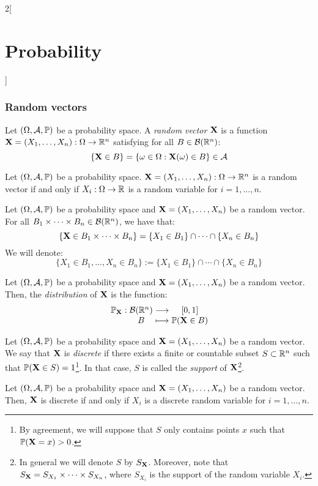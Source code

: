 \documentclass[../../../main.tex]{subfiles}
\begin{document}
\begin{multicols}{2}[\section{Probability}]
  \subsubsection{Random vectors}
  \begin{definition}
    Let $(\Omega,\mathcal{A},\mathbb{P})$ be a probability space. A \emph{random vector} $\boldsymbol{\mathrm{X}}$ is a function $\boldsymbol{\mathrm{X}}=(X_1,\ldots,X_n):\Omega\rightarrow\mathbb{R}^n$ satisfying for all $B\in\mathcal{B}(\mathbb{R}^n)$: $$\{\boldsymbol{\mathrm{X}}\in B\}=\{\omega\in\Omega:\boldsymbol{\mathrm{X}}(\omega)\in B\}\in\mathcal{A}$$
  \end{definition}
  \begin{proposition}
    Let $(\Omega,\mathcal{A},\mathbb{P})$ be a probability space. $\boldsymbol{\mathrm{X}}=(X_1,\ldots,X_n):\Omega\rightarrow\mathbb{R}^n$ is a random vector if and only if $X_i:\Omega\rightarrow\mathbb{R}$ is a random variable for $i=1,\ldots,n$.
  \end{proposition}
  \begin{definition}
    Let $(\Omega,\mathcal{A},\mathbb{P})$ be a probability space and $\boldsymbol{\mathrm{X}}=(X_1,\ldots,X_n)$ be a random vector. For all $B_1\times\cdots\times B_n\in\mathcal{B}(\mathbb{R}^n)$, we have that: $$\{\boldsymbol{\mathrm{X}}\in B_1\times\cdots\times B_n\}=\{X_1\in B_1\}\cap\cdots\cap\{X_n\in B_n\}$$ We will denote: $$\{X_1\in B_1,\ldots,X_n\in B_n\}:=\{X_1\in B_1\}\cap\cdots\cap\{X_n\in B_n\}$$
  \end{definition}
  \begin{definition}
    Let $(\Omega,\mathcal{A},\mathbb{P})$ be a probability space and $\boldsymbol{\mathrm{X}}=(X_1,\ldots,X_n)$ be a random vector. Then, the \emph{distribution} of $\boldsymbol{\mathrm{X}}$ is the function:
    $$
      \function{\Prob_{\vf{X}}}{\mathcal{B}(\RR^n)}{[0,1]}{B}{\Prob(\vf{X}\in B)}
    $$
  \end{definition}
  \begin{definition}
    Let $(\Omega,\mathcal{A},\mathbb{P})$ be a probability space and $\boldsymbol{\mathrm{X}}=(X_1,\ldots,X_n)$ be a random vector. We say that $\boldsymbol{\mathrm{X}}$ is \emph{discrete} if there exists a finite or countable subset $S\subset\mathbb{R}^n$ such that $\mathbb{P}(\boldsymbol{\mathrm{X}}\in S)=1$\footnote{By agreement, we will suppose that $S$ only contains points $x$ such that $\mathbb{P}(\boldsymbol{\mathrm{X}}=x)>0$.}. In that case, $S$ is called the \emph{support} of $\boldsymbol{\mathrm{X}}$\footnote{In general we will denote $S$ by $S_{\boldsymbol{\mathrm{X}}}$. Moreover, note that $S_{\boldsymbol{\mathrm{X}}}=S_{X_1}\times\cdots\times S_{X_n}$, where $S_{X_i}$ is the support of the random variable $X_i$.}.
  \end{definition}
  \begin{proposition}
    Let $(\Omega,\mathcal{A},\mathbb{P})$ be a probability space and $\boldsymbol{\mathrm{X}}=(X_1,\ldots,X_n)$ be a random vector. Then, $\boldsymbol{\mathrm{X}}$ is discrete if and only if $X_i$ is a discrete random variable for $i=1,\ldots,n$.

\end{proposition}
\end{multicols}
\end{document}
